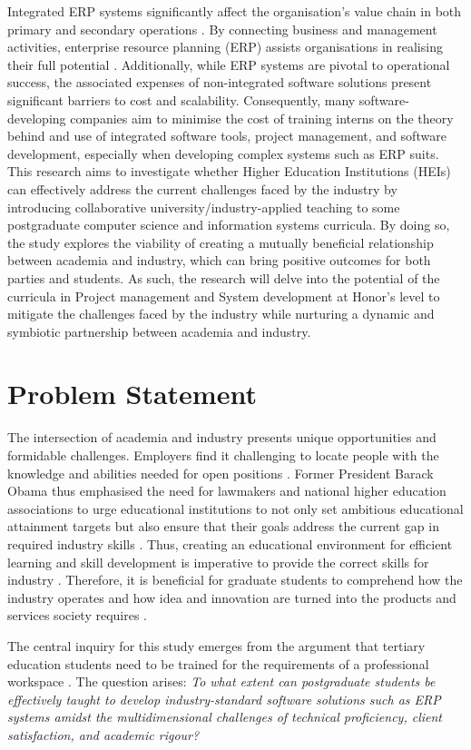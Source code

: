 \par{Integrated ERP systems significantly affect the organisation's value chain in both primary and secondary operations \citep{amini2020erp}. By connecting business and management
activities, enterprise resource planning (ERP) assists organisations in realising their full potential \citep{uccakturk2013effects}. Additionally, while ERP systems are pivotal to operational
success, the associated expenses of non-integrated software solutions present significant barriers
to cost and scalability. Consequently, many software-developing companies aim to minimise the
cost of training interns on the theory behind and use of integrated software tools, project management, and software development, especially when developing complex systems such as ERP suits. This research aims to investigate whether Higher Education Institutions (HEIs) can effectively address the current challenges faced by the industry by introducing collaborative
university/industry-applied teaching to some postgraduate computer science and information
systems curricula. By doing so, the study explores the viability of creating a mutually beneficial
relationship between academia and industry, which can bring positive outcomes for both parties and students. As such, the research will delve into the potential of the curricula in Project management and System development at Honor's level to mitigate the challenges faced by the
industry while nurturing a dynamic and symbiotic partnership between academia and industry.}

\section{Problem Statement}
\par{The intersection of academia and industry presents unique opportunities and formidable
challenges. Employers find it challenging to locate people with the knowledge and abilities
needed for open positions \citep{barnett2011partnering}. Former President Barack Obama thus emphasised the need for lawmakers and national higher education associations to urge educational institutions to not only set ambitious educational attainment targets but also ensure that their goals address the current gap in required industry skills \cite{barnett2011partnering}. Thus, creating an educational environment for efficient learning and skill development is imperative to provide the correct skills for industry \citep{baig2018bridging}. Therefore, it is beneficial for graduate students to comprehend how the industry operates and how idea and innovation are turned into the products and services society requires \citep{foley1997technology}.}
\par{The central inquiry for this study emerges from the argument that tertiary education students
need to be trained for the requirements of a professional workspace \citep{baig2018bridging}. The
question arises: \textit{To what extent can postgraduate students be effectively taught to
develop industry-standard software solutions such as ERP systems amidst the multidimensional challenges of technical proficiency, client satisfaction, and academic rigour?}}


